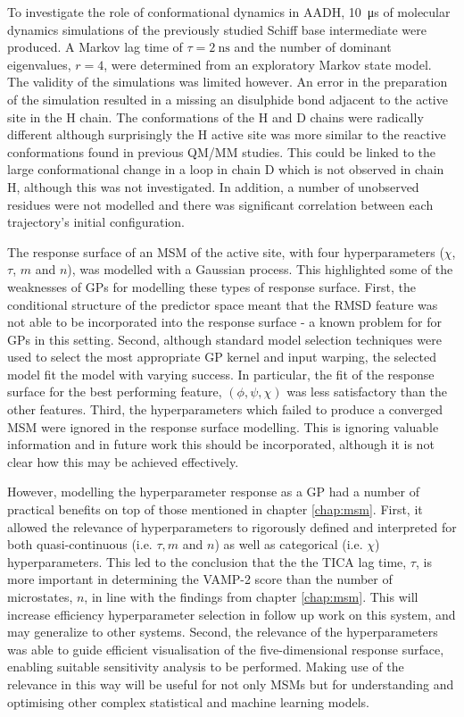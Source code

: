 To investigate the role of conformational dynamics in AADH, \SI{10}{\micro\second} of molecular dynamics simulations of the previously studied Schiff base intermediate were produced. A Markov lag time of $\tau=\SI{2}{\nano\second}$ and the number of dominant eigenvalues, $r=4$, were determined from an exploratory Markov state model. The validity of the simulations was limited however. An error in the preparation of the simulation resulted in a missing an disulphide bond adjacent to the active site in the H chain. The conformations of the H and D chains were radically different although surprisingly the H active site was more similar to the reactive conformations found in previous QM/MM studies. This could be linked to the large conformational change in a loop in chain D which is not observed in chain H, although this was not investigated. In addition, a number of unobserved residues were not modelled and there was significant correlation between each trajectory's initial configuration. 

The response surface of an MSM of the active site, with four hyperparameters ($\chi$, $\tau$, $m$ and $n$), was modelled with a Gaussian process. This highlighted some of the weaknesses of GPs for modelling these types of response surface. First, the conditional structure of the predictor space meant that the RMSD feature was not able to be incorporated into the response surface - a known problem for for GPs in this setting. Second, although standard model selection techniques were used to select the most appropriate GP kernel and input warping, the selected model fit the model with varying success. In particular, the fit of the response surface for the best performing feature, $(\phi, \psi, \chi)$  was less satisfactory than the other features. Third, the hyperparameters which failed to produce a converged MSM were ignored in the response surface modelling. This is ignoring valuable information and in future work this should be incorporated, although it is not clear how this may be achieved effectively. 

However, modelling the hyperparameter response as a GP had a number of practical benefits on top of those mentioned in chapter \ref{chap:msm}. First, it allowed the relevance of hyperparameters to rigorously defined and interpreted for both quasi-continuous (i.e. $\tau, m$ and $n$) as well as categorical (i.e. $\chi$) hyperparameters. This led to the conclusion that the the TICA lag time, $\tau$, is more important in determining the VAMP-2 score than the number of microstates, $n$, in line with the findings from chapter \ref{chap:msm}. This will increase efficiency hyperparameter selection in follow up work on this system, and may generalize to other systems.  Second, the relevance of the hyperparameters was able to guide efficient visualisation of the five-dimensional response surface, enabling suitable sensitivity analysis to be performed. Making use of the relevance in this way will be useful for not only MSMs but for understanding and optimising other complex statistical and machine learning models. 

